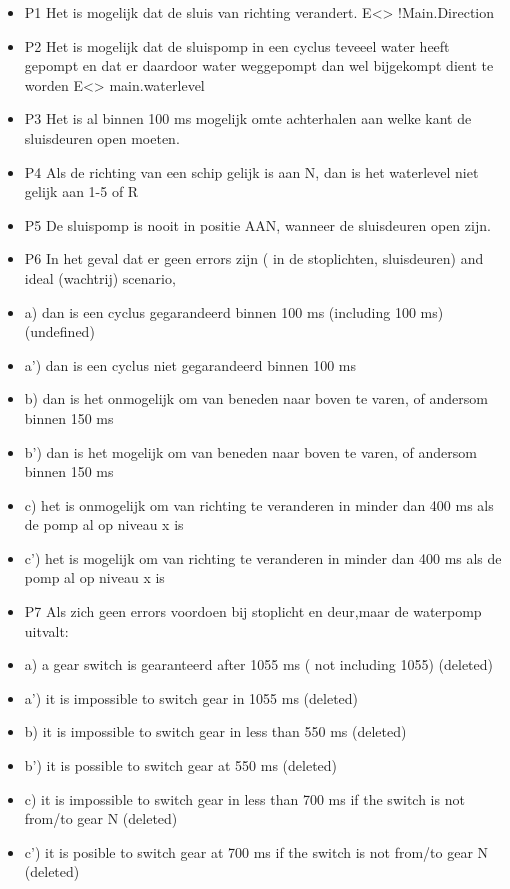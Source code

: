 \documentclass{article}
\begin{document}
	\begin{itemize}
		\item  P1 Het is mogelijk dat de sluis van richting verandert.
		E<> !Main.Direction
		\item  P2 Het is mogelijk dat de sluispomp in een cyclus teveeel water heeft gepompt en dat er daardoor water weggepompt dan wel bijgekompt dient te worden
		E<> main.waterlevel
		\item  P3 Het is al binnen 100 ms mogelijk omte achterhalen aan welke kant de sluisdeuren  open moeten.
		\item  P4 Als de richting van een schip gelijk is aan N, dan is het waterlevel niet gelijk aan 1-5 of R
		\item  P5 De sluispomp is nooit in positie AAN, wanneer de sluisdeuren open zijn.
		\item  P6 In het geval dat er geen errors zijn (  in de stoplichten, sluisdeuren) and ideal (wachtrij) scenario,
		\item  a) dan is een cyclus gegarandeerd binnen 100 ms (including 100 ms) (undefined)
		\item  a') dan is een cyclus niet gegarandeerd binnen 100 ms
		\item  b)  dan is het onmogelijk om van beneden naar boven te varen, of andersom binnen 150 ms
		\item  b') dan is het mogelijk om van beneden naar boven te varen, of andersom binnen 150 ms
		\item  c) het is onmogelijk om van richting te veranderen in minder dan 400 ms als de pomp al op niveau x is
		\item  c') het is mogelijk om van richting te veranderen in minder dan 400 ms als de pomp al op niveau x is
		\item  P7 Als zich geen errors voordoen bij stoplicht en deur,maar de waterpomp uitvalt:
		\item  a)  a gear switch is gearanteerd after 1055 ms ( not including  1055)  (deleted)
		\item  a') it is impossible  to switch gear in 1055 ms     (deleted)
		\item  b) it is  impossible to switch gear in less than 550 ms (deleted)
		\item  b') it is possible to switch gear at 550 ms (deleted)
		\item  c) it is impossible to switch  gear in  less than 700 ms if the switch is not from/to gear N (deleted)
		\item  c') it is posible to switch gear at 700 ms if the switch is not from/to gear N (deleted)
		

\end{itemize}
\end{document}
